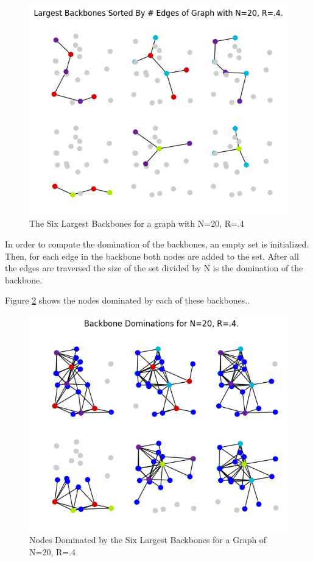 \documentclass{article}
\begin{document}
    \begin{figure}
      \centering
      \label{six_backbones}
      \includegraphics[width=1 \textwidth]{walkthrough/largest_backbones}
      \caption{The Six Largest Backbones for a graph with N=20, R=.4}
    \end{figure}
    In order to compute the domination of the backbones, an empty set is initialized.
    Then, for each edge in the backbone both nodes are added to the set.
    After all the edges are traversed the size of the set divided by N is the domination of the backbone.

    Figure \ref{dominations} shows the nodes dominated by each of these backbones..

    \begin{figure}
      \centering
      \label{dominations}
      \includegraphics[width=1 \textwidth]{walkthrough/backbone_dominations}
      \caption{Nodes Dominated by the Six Largest Backbones for a Graph of N=20, R=.4}
    \end{figure}
\end{document}
